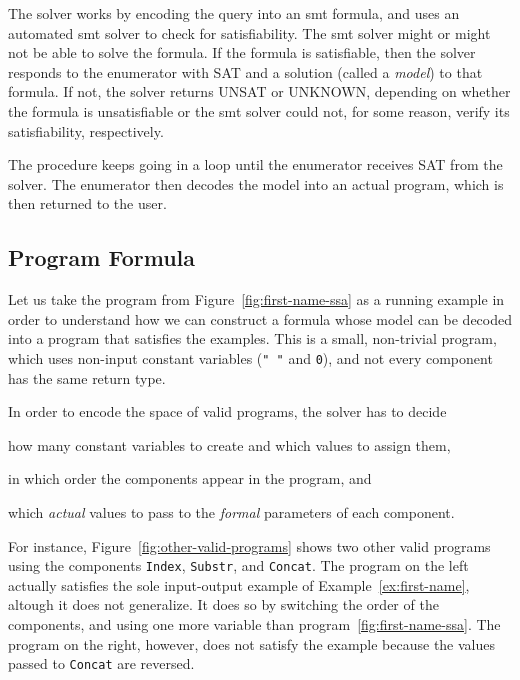 The solver works by encoding the query into an \gls{smt} formula, and uses an
automated \gls{smt} solver to check for satisfiability. The \gls{smt} solver
might or might not be able to solve the formula. If the formula is satisfiable,
then the solver responds to the enumerator with SAT and a solution (called a
\textit{model}) to that formula. If not, the solver returns UNSAT or UNKNOWN,
depending on whether the formula is unsatisfiable or the \gls{smt} solver could
not, for some reason, verify its satisfiability, respectively.

The procedure keeps going in a loop until the enumerator receives SAT from the
solver. The enumerator then decodes the model into an actual program, which is
then returned to the user.

\subsection{Program Formula}
\label{sec:program-formula}

Let us take the program from Figure~\ref{fig:first-name-ssa} as a running
example in order to understand how we can construct a formula whose model can be
decoded into a program that satisfies the examples. This is a small, non-trivial
program, which uses non-input constant variables (\lstinline{" "} and
\lstinline{0}), and not every component has the same return type.

In order to encode the space of valid programs, the solver has to decide
\begin{enumerate*}[(1)]
\item how many constant variables to create and which values to assign them,
\item in which order the components appear in the program, and
\item which \textit{actual} values to pass to the \textit{formal} parameters of
  each component.
\end{enumerate*}

For instance, Figure~\ref{fig:other-valid-programs} shows two other valid
programs using the components \lstinline{Index}, \lstinline{Substr}, and
\lstinline{Concat}. The program on the left actually satisfies the sole
input-output example of Example~\ref{ex:first-name}, altough it does not
generalize. It does so by switching the order of the components, and using one
more variable than program~\ref{fig:first-name-ssa}. The program on the right,
however, does not satisfy the example because the values passed to
\lstinline{Concat} are reversed.

